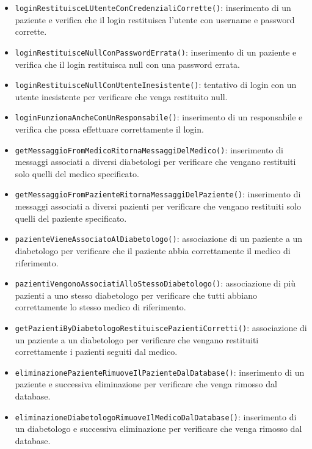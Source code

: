 \begin{itemize}
	\item \texttt{loginRestituisceLUtenteConCredenzialiCorrette()}: inserimento di un paziente e verifica che il login restituisca l'utente con username e password corrette.
	
	\item \texttt{loginRestituisceNullConPasswordErrata()}: inserimento di un paziente e verifica che il login restituisca null con una password errata.
	
	\item \texttt{loginRestituisceNullConUtenteInesistente()}: tentativo di login con un utente inesistente per verificare che venga restituito null.
	
	\item \texttt{loginFunzionaAncheConUnResponsabile()}: inserimento di un responsabile e verifica che possa effettuare correttamente il login.
	
	\item \texttt{getMessaggioFromMedicoRitornaMessaggiDelMedico()}: inserimento di messaggi associati a diversi diabetologi per verificare che vengano restituiti solo quelli del medico specificato.
	
	\item \texttt{getMessaggioFromPazienteRitornaMessaggiDelPaziente()}: inserimento di messaggi associati a diversi pazienti per verificare che vengano restituiti solo quelli del paziente specificato.
	
	\item \texttt{pazienteVieneAssociatoAlDiabetologo()}: associazione di un paziente a un diabetologo per verificare che il paziente abbia correttamente il medico di riferimento.
	
	\item \texttt{pazientiVengonoAssociatiAlloStessoDiabetologo()}: associazione di più pazienti a uno stesso diabetologo per verificare che tutti abbiano correttamente lo stesso medico di riferimento.
	
	\item \texttt{getPazientiByDiabetologoRestituiscePazientiCorretti()}: associazione di un paziente a un diabetologo per verificare che vengano restituiti correttamente i pazienti seguiti dal medico.
	
	\item \texttt{eliminazionePazienteRimuoveIlPazienteDalDatabase()}: inserimento di un paziente e successiva eliminazione per verificare che venga rimosso dal database.
	
	\item \texttt{eliminazioneDiabetologoRimuoveIlMedicoDalDatabase()}: inserimento di un diabetologo e successiva eliminazione per verificare che venga rimosso dal database.
	

\end{itemize}
